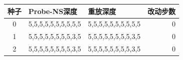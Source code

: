 \begin{tabular}{cllr}
\toprule
种子 & Probe-NS深度 & 重放深度 & 改动步数 \\ \midrule
0 & 5,5,5,5,5,5,5,5,5,5 & 5,5,5,5,5,5,5,5,5,5 & 0 \\
1 & 5,5,5,5,5,5,5,5,3,5 & 5,5,5,5,5,5,5,5,3,5 & 0 \\
2 & 5,5,5,5,5,5,5,5,3,5 & 5,5,5,5,5,5,5,5,3,5 & 0 \\
\bottomrule
\end{tabular}
